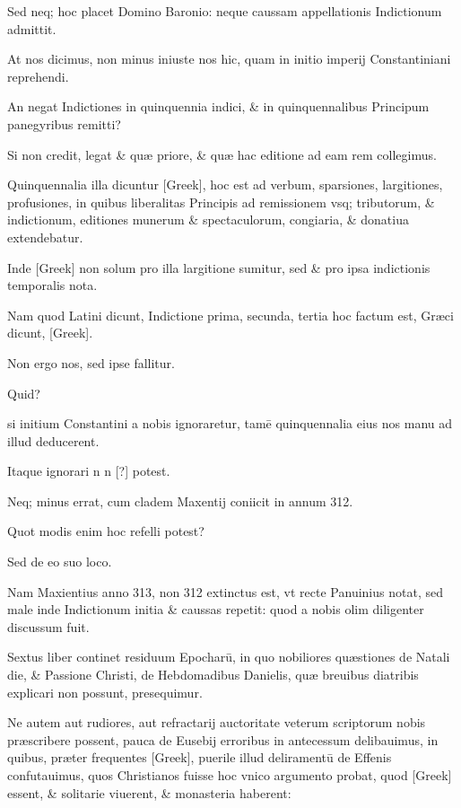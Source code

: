 \begin{parnumbers}
Sed neq; hoc placet Domino Baronio: neque caussam appellationis
Indictionum admittit.

At nos dicimus, non minus iniuste nos
hic, quam in initio imperij Constantiniani reprehendi.

An negat
Indictiones in quinquennia indici, \& in quinquennalibus Principum
panegyribus remitti?

Si non credit, legat \& quæ priore, \& quæ
hac editione ad eam rem collegimus.

Quinquennalia illa dicuntur
\textgreek{[Greek]}, hoc est ad verbum, sparsiones, largitiones, profusiones, in
quibus liberalitas Principis ad remissionem vsq; tributorum, \& indictionum,
editiones munerum \& spectaculorum, congiaria, \& donatiua
extendebatur.

Inde \textgreek{[Greek]} non solum pro illa largitione
sumitur, sed \& pro ipsa indictionis temporalis nota.

Nam quod Latini
dicunt, Indictione prima, secunda, tertia hoc factum est, Græci
dicunt, \textgreek{[Greek]}.

Non ergo nos, sed ipse fallitur.

Quid?

si initium Constantini a nobis ignoraretur, tamē quinquennalia
eius nos manu ad illud deducerent.

Itaque ignorari n n [?]
potest.

Neq; minus errat, cum cladem Maxentij coniicit in annum
312.

Quot modis enim hoc refelli potest?

Sed de eo suo loco.

Nam
Maxientius anno 313, non 312 extinctus est, vt recte Panuinius notat,
sed male inde Indictionum initia \& caussas repetit: quod a nobis
olim diligenter discussum fuit.

Sextus liber continet residuum Epocharū,
in quo nobiliores quæstiones de Natali die, \& Passione Christi,
de Hebdomadibus Danielis, quæ breuibus diatribis explicari
non possunt, presequimur.

Ne autem aut rudiores, aut refractarij auctoritate
veterum scriptorum nobis præscribere possent, pauca de
Eusebij erroribus in antecessum delibauimus, in quibus, præter frequentes
\textgreek{[Greek]}, puerile illud deliramentū de Effenis confutauimus,
quos Christianos fuisse hoc vnico argumento probat, quod
\textgreek{[Greek]} essent, \& solitarie viuerent, \& monasteria haberent:


\end{parnumbers}

